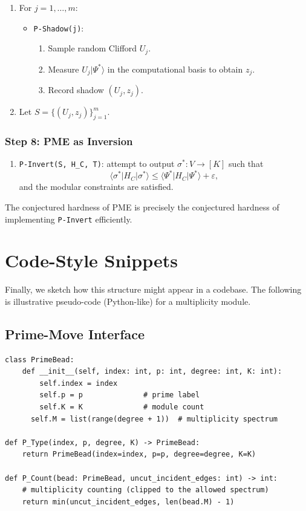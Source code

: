 \documentclass[11pt]{article}
\begin{document}
\begin{enumerate}[label=(7.\arabic*)]
  \item For $j=1,\dots,m$:
  \begin{itemize}
    \item \texttt{P-Shadow(j)}:
    \begin{enumerate}[label=(\alph*)]
      \item Sample random Clifford $U_j$.
      \item Measure $U_j|\Psi^*\rangle$ in the computational basis to obtain $z_j$.
      \item Record shadow $(U_j,z_j)$.
    \end{enumerate}
  \end{itemize}
  \item Let $S = \{(U_j,z_j)\}_{j=1}^m$.
\end{enumerate}

\subsubsection*{Step 8: PME as Inversion}

\begin{enumerate}[label=(8.\arabic*)]
  \item \texttt{P-Invert(S, H\_C, T)}: attempt to output $\sigma^*:V\to[K]$ such that
  \[
    \langle \sigma^*|H_C|\sigma^*\rangle
      \le \langle \Psi^*|H_C|\Psi^*\rangle + \varepsilon,
  \]
  and the modular constraints are satisfied.
\end{enumerate}

The conjectured hardness of PME is precisely the conjectured hardness of implementing \texttt{P-Invert} efficiently.

\section{Code-Style Snippets}

Finally, we sketch how this structure might appear in a codebase. The following is illustrative pseudo-code (Python-like) for a multiplicity module.

\subsection{Prime-Move Interface}

\begin{verbatim}
class PrimeBead:
    def __init__(self, index: int, p: int, degree: int, K: int):
        self.index = index
        self.p = p              # prime label
        self.K = K              # module count
      self.M = list(range(degree + 1))  # multiplicity spectrum

def P_Type(index, p, degree, K) -> PrimeBead:
    return PrimeBead(index=index, p=p, degree=degree, K=K)

def P_Count(bead: PrimeBead, uncut_incident_edges: int) -> int:
    # multiplicity counting (clipped to the allowed spectrum)
    return min(uncut_incident_edges, len(bead.M) - 1)
\end{verbatim}
\end{document}
